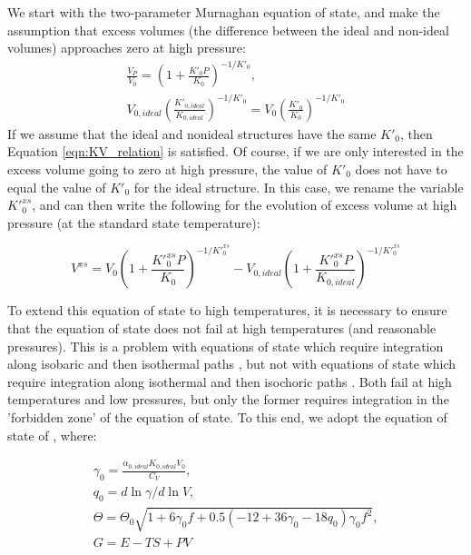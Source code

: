 We start with the two-parameter Murnaghan equation of state, and make the assumption that excess volumes (the difference between the ideal and non-ideal volumes) approaches zero at high pressure:
\begin{eqnarray}
\frac{V_P}{V_0} = \left( 1 + \frac{K'_0P}{K_0} \right)^{-1/K'_0}, \\
V_{0, ideal} \left( \frac{K'_{0, ideal}}{K_{0, ideal}} \right)^{-1/K'_0} = V_{0} \left( \frac{K'_{0}}{K_{0}} \right)^{-1/K'_0}
\end{eqnarray}
If we assume that the ideal and nonideal structures have the same $K'_0$, then Equation \ref{eqn:KV_relation} is satisfied. Of course, if we are only interested in the excess volume going to zero at high pressure, the value of $K'_0$ does not have to equal the value of $K'_0$ for the ideal structure. In this case, we rename the variable $K'_0^{xs}$, and can then write the following for the evolution of excess volume at high pressure (at the standard state temperature):

\begin{equation}
V^{xs} = V_0 \left(1 + \frac{K'_0^{xs} P}{K_0}\right)^{-1/{K'_0^{xs}}} - V_{0, ideal} \left(1 + \frac{K'_0^{xs} P}{K_{0, ideal}}\right)^{-1/{K'_0^{xs}}} 
\end{equation}

To extend this equation of state to high temperatures, it is necessary to ensure that the equation of state does not fail at high temperatures (and reasonable pressures). This is a problem with equations of state which require integration along isobaric and then isothermal paths \citep[e.g.][]{HP2011}, but not with equations of state which require integration along isothermal and then isochoric paths \citep[e.g.][]{SLB2011}. Both fail at high temperatures and low pressures, but only the former requires integration in the 'forbidden zone' of the equation of state. To this end, we adopt the equation of state of \cite{SLB2011}, where:

\begin{eqnarray}
\gamma_0 = \frac{\alpha_{0, ideal} K_{0, ideal} V_0}{C_{V}}, \\
q_0 = d \ln \gamma / d \ln V, \\
\Theta = \Theta_0 \sqrt{1 + 6\gamma_0 f +0.5 \left(-12 + 36 \gamma_0 - 18 q_0 \right) \gamma_0 f^2}, \\
G = E - TS + PV
\end{eqnarray}




